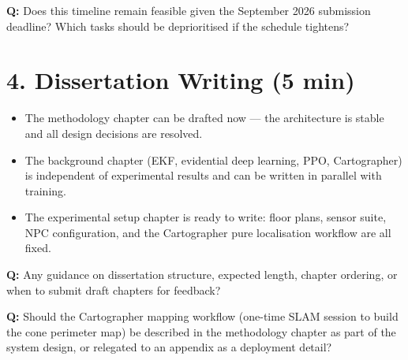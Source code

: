 \documentclass[11pt,a4paper]{article}
\newcommand{\question}[1]{\textcolor{question}{\textbf{Q:}} #1}
\begin{document}
\question{Does this timeline remain feasible given the September 2026 submission
deadline? Which tasks should be deprioritised if the schedule tightens?}

\section*{4. Dissertation Writing (5 min)}

\begin{itemize}[leftmargin=*]
  \item The methodology chapter can be drafted now --- the architecture is stable
    and all design decisions are resolved.
  \item The background chapter (EKF, evidential deep learning, PPO, Cartographer)
    is independent of experimental results and can be written in parallel with
    training.
  \item The experimental setup chapter is ready to write: floor plans, sensor suite,
    NPC configuration, and the Cartographer pure localisation workflow are all fixed.
\end{itemize}

\question{Any guidance on dissertation structure, expected length, chapter ordering,
or when to submit draft chapters for feedback?}

\question{Should the Cartographer mapping workflow (one-time SLAM session to build
the cone perimeter map) be described in the methodology chapter as part of the
system design, or relegated to an appendix as a deployment detail?}
\end{document}
